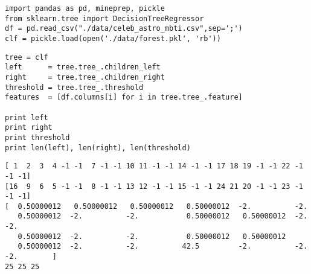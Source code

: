 \documentclass[12pt,fleqn]{article}\usepackage{../common}
\begin{document}
\begin{verbatim}
import pandas as pd, mineprep, pickle
from sklearn.tree import DecisionTreeRegressor
df = pd.read_csv("./data/celeb_astro_mbti.csv",sep=';')
clf = pickle.load(open('./data/forest.pkl', 'rb'))
\end{verbatim}

\begin{verbatim}
tree = clf
left      = tree.tree_.children_left
right     = tree.tree_.children_right
threshold = tree.tree_.threshold
features  = [df.columns[i] for i in tree.tree_.feature]

print left
print right
print threshold
print len(left), len(right), len(threshold)
\end{verbatim}

\begin{verbatim}
[ 1  2  3  4 -1 -1  7 -1 -1 10 11 -1 -1 14 -1 -1 17 18 19 -1 -1 22 -1 -1 -1]
[16  9  6  5 -1 -1  8 -1 -1 13 12 -1 -1 15 -1 -1 24 21 20 -1 -1 23 -1 -1 -1]
[  0.50000012   0.50000012   0.50000012   0.50000012  -2.          -2.
   0.50000012  -2.          -2.           0.50000012   0.50000012  -2.          -2.
   0.50000012  -2.          -2.           0.50000012   0.50000012
   0.50000012  -2.          -2.          42.5         -2.          -2.          -2.        ]
25 25 25
\end{verbatim}
\end{document}
